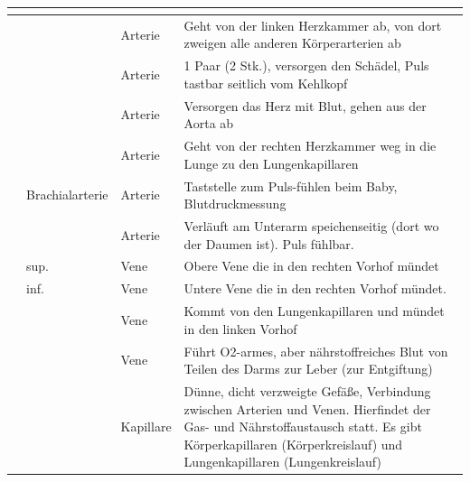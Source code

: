 \begin{tabulary}{\linewidth}{lllL}
\toprule
{}
\\\midrule
{}
 &
 &
Arterie
 &
Geht von der linken Herzkammer ab, von dort zweigen alle anderen
Körperarterien ab
\\\addlinespace
{}
 &
 &
Arterie
 &
1 Paar (2 Stk.), versorgen den Schädel, Puls tastbar seitlich vom
Kehlkopf
\\\addlinespace
{}
 &
 &
Arterie
 &
Versorgen das Herz mit Blut, gehen aus der Aorta ab
\\\addlinespace
{}
 &
 &
Arterie 
 &
 Geht von der rechten Herzkammer weg in
die Lunge zu den Lungenkapillaren 
\\\addlinespace
{}
 &
Brachialarterie
 &
Arterie
 &
Taststelle zum Puls-fühlen beim Baby, Blutdruckmessung
\\\addlinespace
{}
 &
 &
Arterie
 &
Verläuft am Unterarm speichenseitig (dort wo der Daumen ist). Puls
fühlbar.
\\\addlinespace
{}
 &
 sup.
 &
Vene
 &
Obere Vene die in den rechten Vorhof mündet
\\\addlinespace
{}
 &
 inf.
 &
Vene
 &
Untere Vene die in den rechten Vorhof mündet. 
\\\addlinespace
{}
 &
 &
Vene 
 &
 Kommt von den Lungenkapillaren und
mündet in den linken Vorhof 
\\\addlinespace
{}
 &
 &
Vene
 &
Führt O2-armes, aber nährstoffreiches Blut von Teilen des Darms zur
Leber (zur Entgiftung)
\\\addlinespace
{}
 &
 &
Kapillare
 &
Dünne, dicht verzweigte Gefäße, Verbindung zwischen Arterien
und Venen. Hierfindet der Gas- und Nährstoffaustausch statt. Es gibt
Körperkapillaren (Körperkreislauf) und Lungenkapillaren
(Lungenkreislauf)
\\\bottomrule
\end{tabulary}

